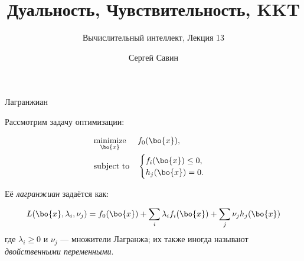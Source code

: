 \documentclass{beamer}
\title{Дуальность, Чувствительность, KKT}
\subtitle{Вычислительный интеллект, Лекция  13}
\author{Сергей Савин}
\date{\mydate}
\begin{document}
\maketitle


%
%





\begin{frame}{Лагранжиан}
	\begin{flushleft}
		
		Рассмотрим задачу оптимизации:
		
		\begin{equation}
			\begin{aligned}
				& \underset{\bo{x}}{\text{minimize}}
				& & f_0(\bo{x}), \\
				& \text{subject to}
				& & \begin{cases}
					f_i(\bo{x}) \leq 0, \\
					h_j(\bo{x}) = 0.
				\end{cases}
			\end{aligned}
		\end{equation}
		
		Её \emph{лагранжиан} задаётся как:
		
		\begin{equation}
			L(\bo{x}, \lambda_i, \nu_j) = 
			f_0(\bo{x}) + 
			\sum\limits_i \lambda_i f_i(\bo{x}) +
			\sum\limits_j \nu_j h_j(\bo{x})
		\end{equation}
		где $\lambda_i \geq 0$ и $\nu_j$ — множители Лагранжа; их также иногда называют \emph{двойственными переменными}.
		
	\end{flushleft}
\end{frame}
\end{document}
